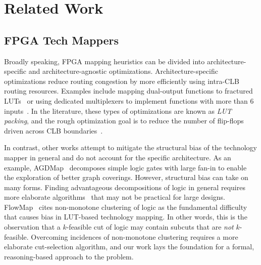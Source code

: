 \section{Related Work}\label{sec:relatedwork}
\subsection{FPGA Tech Mappers}\label{sec:relatedwork:fpga}
Broadly speaking, FPGA mapping heuristics can be divided into
architecture-specific and architecture-agnostic optimizations.
Architecture-specific optimizations reduce routing congestion by more
efficiently using intra-CLB routing resources. Examples include mapping
dual-output functions to fractured LUTs~\cite{fraclut} or using dedicated
multiplexers to implement functions with more than 6 inputs~\cite{ug574}. In
the literature, these types of optimizations are known as \textit{LUT packing},
and the rough optimization goal is to reduce the number of flip-flops driven
across CLB boundaries~\cite{ffpack}.

In contrast, other works attempt to mitigate the structural bias of the
technology mapper in general and do not account for the specific architecture.
As an example, AGDMap~\cite{adaptdecomp} decomposes simple logic gates with
large fan-in to enable the exploration of better graph coverings. However,
structural bias can take on many forms. Finding advantageous decompositions of
logic in general requires more elaborate algorithms~\cite{dsd} that may not be
practical for large designs. FlowMap~\cite{flowmap} cites non-monotone
clustering of logic as the fundamental difficulty that causes bias in LUT-based
technology mapping. In other words, this is the observation that a $k$-feasible
cut of logic may contain subcuts that are \textit{not} $k$-feasible. Overcoming
incidences of non-monotone clustering requires a more elaborate cut-selection
algorithm, and our work lays the foundation for a formal, reasoning-based
approach to the problem.

